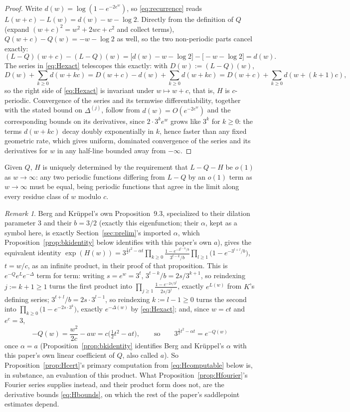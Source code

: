\documentclass[11pt]{amsart}
\theoremstyle{plain}
\theoremstyle{definition}
\theoremstyle{remark}
\newtheorem{remark}[theorem]{Remark}
\begin{document}
\begin{proof}
Write $d(w) = \log(1-e^{-2e^w})$, so \eqref{eq:recurrence} reads $L(w+c)-L(w) = d(w) - w - \log 2$.
Directly from the definition of $Q$ (expand $(w+c)^2 = w^2+2wc+c^2$ and collect terms),
$Q(w+c)-Q(w) = -w-\log2$ as well, so the two non-periodic parts cancel exactly:
\[
(L-Q)(w+c) - (L-Q)(w) = \bigl[d(w)-w-\log2\bigr] - \bigl[-w-\log2\bigr] = d(w).
\]
The series in \eqref{eq:Hexact} telescopes this exactly: with $D(w) := (L-Q)(w)$,
\[
D(w) + \sum_{k\ge0} d(w+kc) = D(w+c) - d(w) + \sum_{k\ge0}d(w+kc) = D(w+c) + \sum_{k\ge0}d(w+(k+1)c),
\]
so the right side of \eqref{eq:Hexact} is invariant under $w \mapsto w+c$, that is, $H$ is
$c$-periodic. Convergence of the series and its termwise differentiability, together with the
stated bound on $\Delta^{(j)}$, follow from $d(w) = O(e^{-2e^w})$ and the corresponding bounds on
its derivatives, since $2\cdot3^k e^w$ grows like $3^k$ for $k\ge0$: the terms $d(w+kc)$ decay
doubly exponentially in $k$, hence faster than any fixed geometric rate, which gives uniform,
dominated convergence of the series and its derivatives for $w$ in any half-line bounded away from
$-\infty$.
\end{proof}

Given $Q$, $H$ is uniquely determined by the requirement that $L-Q-H$ be $o(1)$ as $w\to\infty$: any
two periodic functions differing from $L-Q$ by an $o(1)$ term as $w\to\infty$ must be equal, being
periodic functions that agree in the limit along every residue class of $w$ modulo $c$.

\begin{remark}
\label{rem:bkproduct}
Berg and Kr\"uppel's own Proposition~9.3, specialized to their dilation parameter $3$ and their
$b=3/2$ (exactly this eigenfunction; their $\alpha$, kept as a symbol here, is exactly
Section~\ref{sec:prelim}'s imported $\alpha$, which Proposition~\ref{prop:bkidentity} below
identifies with this paper's own $a$), gives
the equivalent identity $\exp(H(w)) = 3^{\frac12 t^2 - \alpha t}
\prod_{k\ge0}\frac{1-e^{-3^{t-k}/b}}{3^{t-k}/b}\prod_{l\ge1}\bigl(1-e^{-3^{t+l}/b}\bigr)$, $t=w/c$,
as an infinite product, in their proof of that proposition. This is $e^{-Q}e^Le^{-\Delta}$ term for
term: writing $s=e^w=3^t$, $3^{t-k}/b = 2s/3^{k+1}$, so reindexing $j:=k+1\ge1$ turns the first
product into $\prod_{j\ge1}\frac{1-e^{-2s/3^j}}{2s/3^j}$, exactly $e^{L(w)}$ from $K$'s defining
series; $3^{t+l}/b = 2s\cdot3^{l-1}$, so reindexing $k:=l-1\ge0$ turns the second into
$\prod_{k\ge0}\bigl(1-e^{-2s\cdot3^k}\bigr)$, exactly $e^{-\Delta(w)}$ by \eqref{eq:Hexact}; and,
since $w=ct$ and $e^c=3$,
\[
-Q(w) = \frac{w^2}{2c}-aw = c\bigl(\tfrac12t^2-at\bigr), \qquad\text{so}\qquad
3^{\frac12t^2-\alpha t} = e^{-Q(w)}
\]
once $\alpha=a$ (Proposition~\ref{prop:bkidentity} identifies
Berg and Kr\"uppel's $\alpha$ with this paper's own linear coefficient of $Q$, also called $a$).
So Proposition~\ref{prop:Hcert}'s primary computation from \eqref{eq:Hcomputable} below is, in
substance, an evaluation of this product. What Proposition~\ref{prop:Hfourier}'s Fourier series
supplies instead, and their product form does not, are the derivative bounds \eqref{eq:Hbounds},
on which the rest of the paper's saddlepoint estimates depend.
\end{remark}
\end{document}
